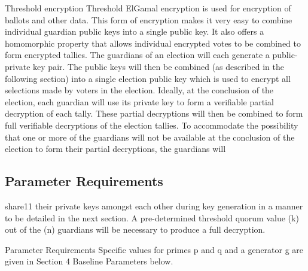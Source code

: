 Threshold encryption Threshold ElGamal encryption is used for encryption of ballots and other data. This form of
encryption makes it very easy to combine individual guardian public keys into a single public key. It also offers a
homomorphic property that allows individual encrypted votes to be combined to form encrypted tallies. The guardians of
an election will each generate a public-private key pair. The public keys will then be combined (as described in the
following section) into a single election public key which is used to encrypt all selections made by voters in the
election. Ideally, at the conclusion of the election, each guardian will use its private key to form a verifiable
partial decryption of each tally. These partial decryptions will then be combined to form full verifiable decryptions of
the election tallies. To accommodate the possibility that one or more of the guardians will not be available at the
conclusion of the election to form their partial decryptions, the guardians will
\cite[6]{eg-spec}

\subsection{Parameter Requirements}
share11 their private keys amongst each other during key generation in a manner to be detailed in the next section. A
pre-determined threshold quorum value (k) out of the (n) guardians will be necessary to produce a full decryption.
\cite[7]{eg-spec}



Parameter Requirements Specific values for primes p and q and a generator g are given in Section 4 Baseline Parameters
below.
\cite[7]{eg-spec}




